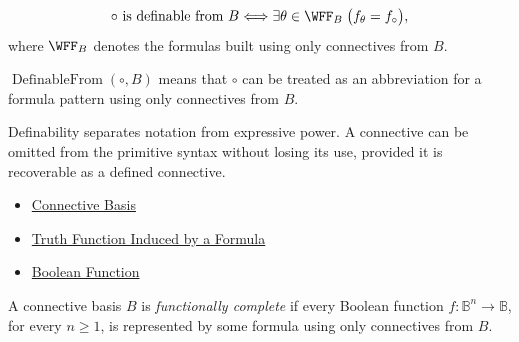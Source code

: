 \begin{remark*}
\[
\circ\text{ is definable from }B
\Longleftrightarrow
\exists\theta\in\WFF_B\;\bigl(f_{\theta}=f_{\circ}\bigr),
\]
where \(\WFF_B\) denotes the formulas built using only connectives from \(B\).
\end{remark*}

\begin{remark*}
\(\operatorname{DefinableFrom}(\circ,B)\) means that \(\circ\) can be treated as
an abbreviation for a formula pattern using only connectives from \(B\).
\end{remark*}

\begin{remark*}[Interpretation]
Definability separates notation from expressive power. A connective can be
omitted from the primitive syntax without losing its use, provided it is
recoverable as a defined connective.
\end{remark*}

\begin{dependencies}
\begin{itemize}
  \item \hyperref[def:connective-basis-propositional-logic]{Connective Basis}
  \item \hyperref[def:truth-function-induced-by-formula]{Truth Function Induced by a Formula}
  \item \hyperref[def:boolean-function-propositional-logic]{Boolean Function}
\end{itemize}
\end{dependencies}

\begin{tcolorbox}[colback=propbox, colframe=propborder, arc=2pt,
  left=6pt, right=6pt, top=4pt, bottom=4pt,
  title={\small\textbf{Definition (Functionally Complete Connective Set)}},
  fonttitle=\small\bfseries]
\begin{definition}
\label{def:functionally-complete-connective-set-propositional-logic}
A connective basis \(B\) is \emph{functionally complete} if every Boolean
function \(f:\mathbb{B}^n\to\mathbb{B}\), for every \(n\ge 1\), is represented
by some formula using only connectives from \(B\).
\end{definition}
\end{tcolorbox}

